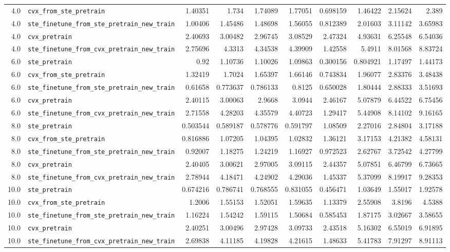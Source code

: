\begin{longtable}{@{}r l *{8}{r}@{}}
4.0 & \texttt{cvx\_from\_ste\_pretrain} & 1.40351 & 1.734 & 1.74089 & 1.77051 & 0.698159 & 1.46422 & 2.15624 & 2.389 \\
4.0 & \texttt{ste\_finetune\_from\_ste\_pretrain\_new\_train} & 1.00406 & 1.45486 & 1.48698 & 1.56055 & 0.812389 & 2.01603 & 3.11142 & 3.65983 \\
4.0 & \texttt{cvx\_pretrain} & 2.40693 & 3.00482 & 2.96745 & 3.08529 & 2.47324 & 4.93631 & 6.25548 & 6.54036 \\
4.0 & \texttt{ste\_finetune\_from\_cvx\_pretrain\_new\_train} & 2.75696 & 4.3313 & 4.34538 & 4.39909 & 1.42558 & 5.4911 & 8.01568 & 8.83724 \\
6.0 & \texttt{ste\_pretrain} & 0.92 & 1.10736 & 1.10026 & 1.09863 & 0.300156 & 0.804921 & 1.17497 & 1.44173 \\
6.0 & \texttt{cvx\_from\_ste\_pretrain} & 1.32419 & 1.7024 & 1.65397 & 1.66146 & 0.743834 & 1.96077 & 2.83376 & 3.48438 \\
6.0 & \texttt{ste\_finetune\_from\_ste\_pretrain\_new\_train} & 0.61658 & 0.773637 & 0.786133 & 0.8125 & 0.650028 & 1.80444 & 2.88333 & 3.51693 \\
6.0 & \texttt{cvx\_pretrain} & 2.40115 & 3.00063 & 2.9668 & 3.0944 & 2.46167 & 5.07879 & 6.44522 & 6.75456 \\
6.0 & \texttt{ste\_finetune\_from\_cvx\_pretrain\_new\_train} & 2.71558 & 4.28203 & 4.35579 & 4.40723 & 1.29417 & 5.44908 & 8.14102 & 9.16165 \\
8.0 & \texttt{ste\_pretrain} & 0.503544 & 0.589187 & 0.578776 & 0.591797 & 1.08509 & 2.27016 & 2.84804 & 3.17188 \\
8.0 & \texttt{cvx\_from\_ste\_pretrain} & 0.816886 & 1.07205 & 1.04395 & 1.02832 & 1.36121 & 3.17153 & 4.21382 & 4.58131 \\
8.0 & \texttt{ste\_finetune\_from\_ste\_pretrain\_new\_train} & 0.92007 & 1.18275 & 1.24219 & 1.16927 & 0.972523 & 2.62767 & 3.72542 & 4.27799 \\
8.0 & \texttt{cvx\_pretrain} & 2.40405 & 3.00621 & 2.97005 & 3.09115 & 2.44357 & 5.07851 & 6.46799 & 6.73665 \\
8.0 & \texttt{ste\_finetune\_from\_cvx\_pretrain\_new\_train} & 2.78944 & 4.18471 & 4.24902 & 4.29036 & 1.45337 & 5.37099 & 8.19917 & 9.28353 \\
10.0 & \texttt{ste\_pretrain} & 0.674216 & 0.786741 & 0.768555 & 0.831055 & 0.456471 & 1.03649 & 1.55017 & 1.92578 \\
10.0 & \texttt{cvx\_from\_ste\_pretrain} & 1.2006 & 1.55153 & 1.52051 & 1.59635 & 1.13379 & 2.55908 & 3.8196 & 4.5388 \\
10.0 & \texttt{ste\_finetune\_from\_ste\_pretrain\_new\_train} & 1.16224 & 1.54242 & 1.59115 & 1.50684 & 0.585453 & 1.87175 & 3.02667 & 3.58655 \\
10.0 & \texttt{cvx\_pretrain} & 2.40251 & 3.00496 & 2.97428 & 3.09733 & 2.43518 & 5.16302 & 6.55019 & 6.91895 \\
10.0 & \texttt{ste\_finetune\_from\_cvx\_pretrain\_new\_train} & 2.69838 & 4.11185 & 4.19828 & 4.21615 & 1.48633 & 5.41783 & 7.91297 & 8.91113 \\
\end{longtable}

